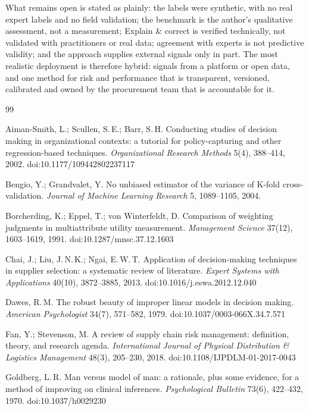 \documentclass[10pt,twocolumn,a4paper]{article}
\begin{document}
What remains open is stated as plainly: the labels were synthetic, with no real expert
labels and no field validation; the benchmark is the author's qualitative assessment, not a
measurement; Explain \& correct is verified technically, not validated with practitioners or
real data; agreement with experts is not predictive validity; and the approach supplies external signals only in part.
The most realistic deployment is therefore hybrid: signals from a platform or open data,
and one method for risk and performance that is transparent, versioned, calibrated and
owned by the procurement team that is accountable for it.

\begin{thebibliography}{99}\small
\setlength{\itemsep}{1.5pt}

 Aiman-Smith, L.; Scullen, S.\,E.; Barr, S.\,H. Conducting
studies of decision making in organizational contexts: a tutorial for policy-capturing
and other regression-based techniques. \emph{Organizational Research Methods} 5(4),
388--414, 2002. doi:10.1177/109442802237117

 Bengio, Y.; Grandvalet, Y. No unbiased estimator of the variance of
K-fold cross-validation. \emph{Journal of Machine Learning Research} 5, 1089--1105, 2004.

 Borcherding, K.; Eppel, T.; von Winterfeldt, D. Comparison of
weighting judgments in multiattribute utility measurement. \emph{Management Science}
37(12), 1603--1619, 1991. doi:10.1287/mnsc.37.12.1603

 Chai, J.; Liu, J.\,N.\,K.; Ngai, E.\,W.\,T. Application of
decision-making techniques in supplier selection: a systematic review of literature.
\emph{Expert Systems with Applications} 40(10), 3872--3885, 2013.
doi:10.1016/j.eswa.2012.12.040

 Dawes, R.\,M. The robust beauty of improper linear models in decision
making. \emph{American Psychologist} 34(7), 571--582, 1979. doi:10.1037/0003-066X.34.7.571

 Fan, Y.; Stevenson, M. A review of supply chain risk management:
definition, theory, and research agenda. \emph{International Journal of Physical
Distribution \& Logistics Management} 48(3), 205--230, 2018.
doi:10.1108/IJPDLM-01-2017-0043

 Goldberg, L.\,R. Man versus model of man: a rationale, plus some
evidence, for a method of improving on clinical inferences. \emph{Psychological Bulletin}
73(6), 422--432, 1970. doi:10.1037/h0029230


\end{thebibliography}
\end{document}
